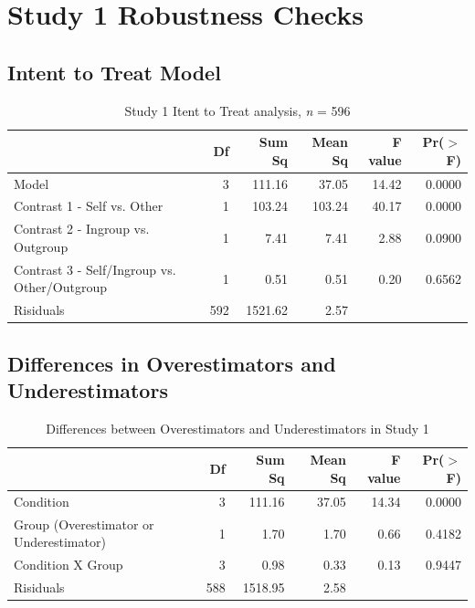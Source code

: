 \documentclass[12pt,]{article}
\begin{document}

\clearpage
\section{Study 1 Robustness Checks}
\label{appendix:study1_robust}


\subsection{Intent to Treat Model}
\label{appendix:itt1}


\begin{table}[ht]
\centering
\begin{tabular}{lrrrrr}
  \hline
 & Df & Sum Sq & Mean Sq & F value & Pr($>$F) \\ 
  \hline
Model & 3 & 111.16 & 37.05 & 14.42 & 0.0000 \\ 
  Contrast 1 - Self vs. Other & 1 & 103.24 & 103.24 & 40.17 & 0.0000 \\ 
  Contrast 2 - Ingroup vs. Outgroup & 1 & 7.41 & 7.41 & 2.88 & 0.0900 \\ 
  Contrast 3 - Self/Ingroup vs. Other/Outgroup & 1 & 0.51 & 0.51 & 0.20 & 0.6562 \\ 
  Risiduals & 592 & 1521.62 & 2.57 &  &  \\ 
   \hline
\end{tabular}
\caption{Study 1 Itent to Treat analysis, \emph{n} = 596} 
\label{ITT_s1}
\end{table}


\subsection{Differences in Overestimators and Underestimators}
\label{appendix:over_under1}

\begin{table}[ht]
\centering
\begin{tabular}{lrrrrr}
  \hline
 & Df & Sum Sq & Mean Sq & F value & Pr($>$F) \\ 
  \hline
Condition & 3 & 111.16 & 37.05 & 14.34 & 0.0000 \\ 
  Group (Overestimator or Underestimator) & 1 & 1.70 & 1.70 & 0.66 & 0.4182 \\ 
  Condition X Group & 3 & 0.98 & 0.33 & 0.13 & 0.9447 \\ 
  Risiduals & 588 & 1518.95 & 2.58 &  &  \\ 
   \hline
\end{tabular}
\caption{Differences between Overestimators and Underestimators in Study 1} 
\label{over_underS1}
\end{table}
\end{document}
